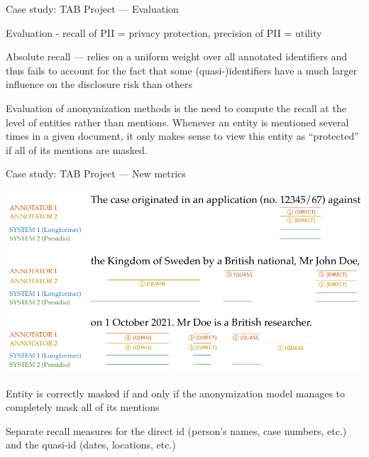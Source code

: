 \documentclass[12pt,aspectratio=169,handout]{beamer}
\begin{document}
\begin{frame}{Case study: TAB Project --- Evaluation}

Evaluation - recall of PII = privacy protection, precision of PII = utility

Absolute recall --- relies on a uniform weight over all annotated identifiers and thus fails to account for the fact that some (quasi-)identifiers have a much larger influence on the disclosure risk than others

Evaluation of anonymization methods is the need to compute the recall at the level of entities rather than mentions. Whenever an entity is mentioned several times in a given document, it only makes sense to view this entity as “protected” if all of its mentions are masked.

\end{frame}


\begin{frame}{Case study: TAB Project --- New metrics}

\includegraphics[width=0.8\linewidth]{img/tab3}

Entity is correctly masked if and only if the anonymization model manages to completely mask all of its mentions

Separate recall measures for the direct id (person’s names, case numbers, etc.) and the quasi-id (dates, locations, etc.)

\end{frame}
\end{document}
